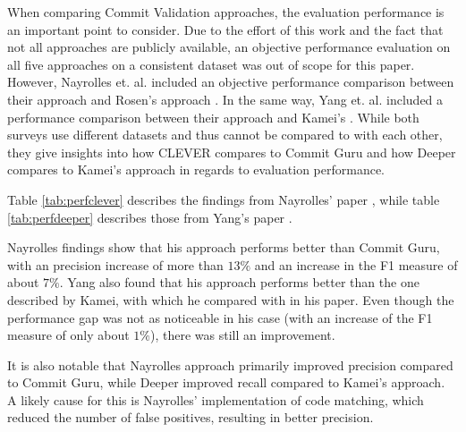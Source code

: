 When comparing Commit Validation approaches, the evaluation performance is an important point to consider. Due to the effort of this work and the fact that not all approaches are publicly available, an objective performance evaluation on all five approaches on a consistent dataset was out of scope for this paper. However, Nayrolles et. al. included an objective performance comparison between their approach and Rosen's approach \cite{Nayrolles2018}. In the same 
way, %
Yang et. al. included a performance comparison between their approach and Kamei's \cite{Yang2015}. While both surveys use different datasets and thus cannot be compared to with each other, they give insights into how CLEVER compares to Commit Guru and how Deeper compares to Kamei's approach in regards to evaluation performance.

Table \ref{tab:perfclever} describes the findings from Nayrolles' paper \cite{Nayrolles2018}, while table \ref{tab:perfdeeper} describes those from Yang's paper \cite{Yang2015}.

Nayrolles findings show that his approach performs better than Commit Guru, with an precision increase of more than $13\%$ and an increase in the F1 measure of about $7\%$. Yang also found that his approach performs better than the one described by Kamei, with which he compared with in his paper. Even though the performance gap was not as noticeable in his case (with an increase of the F1 measure of only about $1\%$), there was still an improvement. 

It is also notable that Nayrolles approach primarily improved precision compared to Commit Guru, while Deeper improved recall compared to Kamei's approach. 
A likely cause for this is Nayrolles' implementation of code matching, which reduced the number of false positives, resulting in better precision.


